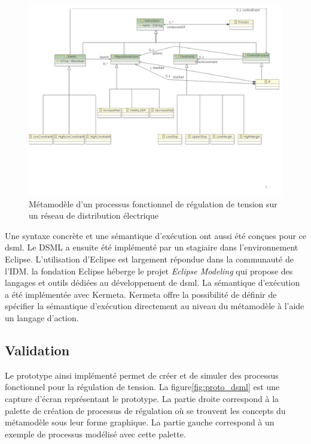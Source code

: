 \begin{figure}[!ht]
 \begin{center}
  \includegraphics[trim = 0cm 3cm 0cm 0cm, width=1\textwidth]{figures/6_methodologie/metamodele_dsml.pdf}
 \end{center}
 \caption{Métamodèle d'un processus fonctionnel de régulation de tension sur un réseau de distribution électrique}
 \label{fig:meta_dsml}
\end{figure} 

Une syntaxe concrète et une sémantique d'exécution ont aussi été conçues pour ce
\gls{dsml}. Le DSML a ensuite été implémenté par un stagiaire dans
l'environnement Eclipse. L'utilisation d'Eclipse est largement répondue dans la
communauté de l'IDM. la fondation Eclipse héberge le projet \textit{Eclipse
Modeling }qui propose des langages et outils dédiées au développement de
\gls{dsml}. La sémantique d'exécution a été implémentée avec Kermeta. Kermeta
offre la possibilité de définir de spécifier la sémantique d'exécution
directement au niveau du métamodèle à l'aide un langage d'action.

		
            \subsection{Validation} Le prototype ainsi implémenté permet de
créer et de simuler des processus fonctionnel pour la régulation de tension. La
figure\ref{fig:proto_dsml} est une capture d'écran représentant le prototype. La
partie droite correspond à la palette de création de processus de régulation où
se trouvent les concepts du métamodèle sous leur forme graphique. La partie
gauche correspond à un exemple de processus modélisé avec cette palette.

